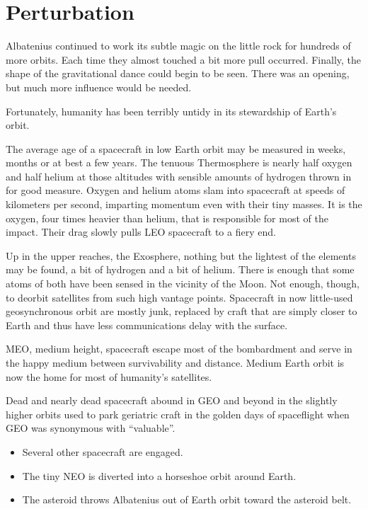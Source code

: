 %
%

\chapter{Perturbation}

Albatenius continued to work its subtle magic on the little rock for hundreds of more orbits. Each time they almost touched a bit more pull occurred. Finally, the shape of the gravitational dance could begin to be seen. There was an opening, but much more influence would be needed.

Fortunately, humanity has been terribly untidy in its stewardship of Earth's orbit.

The average age of a spacecraft in low Earth orbit may be measured in weeks, months or at best a few years. The tenuous Thermosphere is nearly half oxygen and half helium at those altitudes with sensible amounts of hydrogen thrown in for good measure. Oxygen and helium atoms slam into spacecraft at speeds of kilometers per second, imparting momentum even with their tiny masses. It is the oxygen, four times heavier than helium, that is responsible for most of the impact. Their drag slowly pulls LEO spacecraft to a fiery end.

Up in the upper reaches, the Exosphere, nothing but the lightest of the elements may be found, a bit of hydrogen and a bit of helium. There is enough that some atoms of both have been sensed in the vicinity of the Moon. Not enough, though, to deorbit satellites from such high vantage points. Spacecraft in now little-used geosynchronous orbit are mostly junk, replaced by craft that are simply closer to Earth and thus have less communications delay with the surface.

MEO, medium height, spacecraft escape most of the bombardment and serve in the happy medium between survivability and distance. Medium Earth orbit is now the home for most of humanity's satellites.

Dead and nearly dead spacecraft abound in GEO and beyond in the slightly higher orbits used to park geriatric craft in the golden days of spaceflight when GEO was synonymous with ``valuable''.

\begin{itemize}
\item{Several other spacecraft are engaged.}
\item{The tiny NEO is diverted into a horseshoe orbit around Earth.}
\item{The asteroid throws Albatenius out of Earth orbit toward the asteroid belt.}
\end{itemize}

\newpage
\thispagestyle{empty}
